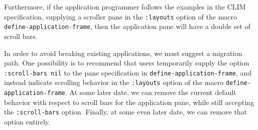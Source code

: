 Furthermore, if the application programmer follows the examples in the
CLIM specification, supplying a scroller pane in the \texttt{:layouts}
option of the macro \texttt{define-application-frame}, then the
application pane will have a double set of scroll bars.

In order to avoid breaking existing applications, we must suggest a
migration path.  One possibility is to recommend that users
temporarily supply the option \texttt{:scroll-bars nil} to the pane
specification in \texttt{define-application-frame}, and instead
indicate scrolling behavior in the \texttt{:layouts} option of the
macro \texttt{define-application-frame}.  At some later date, we can
remove the current default behavior with respect to scroll bars for
the application pane, while still accepting the \texttt{:scroll-bars}
option.  Finally, at some even later date, we can remove that option
entirely.
